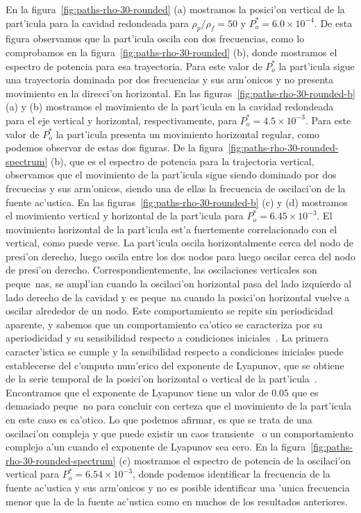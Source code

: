 En la figura~\ref{fig:paths-rho-30-rounded} (a) mostramos la posici'on vertical de la part'icula
para la cavidad redondeada para  $\rho_p/\rho_f = 50$ y  $P_o^\ast = 6.0\times 10^{-4} $. De
esta figura observamos que la part'icula oscila con dos frecuencias, como lo
comprobamos en la figura~\ref{fig:paths-rho-30-rounded} (b), donde mostramos el espectro
de potencia para esa trayectoria. Para este valor de $P_o^\ast$ la part'icula sigue una 
trayectoria dominada por dos frecuencias y sus arm'onicos y no presenta movimiento en la
direcci'on horizontal. En las figuras~\ref{fig:paths-rho-30-rounded-b} (a) y (b) mostramos
el movimiento de la part'icula en la cavidad redondeada para el eje vertical y 
horizontal, respectivamente, para $P_o^\ast = 4.5 \times 10^{-3}$. Para este valor 
de $P_o^\ast$ la part'icula presenta un movimiento horizontal regular, como podemos observar
de estas dos figuras. De la figura~\ref{fig:paths-rho-30-rounded-spectrum} (b), que es el
espectro de potencia para la trajectoria vertical, observamos que el movimiento de la part'icula
sigue siendo dominado por dos frecuecias y sus arm'onicos, siendo una de ellas la frecuencia
de oscilaci'on de la fuente ac'ustica.
En las figuras~\ref{fig:paths-rho-30-rounded-b} (c) y (d) mostramos
el movimiento vertical y horizontal de la part'icula para $P_o^\ast = 6.45\times 10^{-3}$. 
El movimiento horizontal de la part'icula est'a fuertemente correlacionado con el vertical, como 
puede verse. La part'icula oscila horizontalmente cerca del
nodo de presi'on derecho, luego oscila entre los dos nodos para luego oscilar cerca del nodo de 
presi'on derecho. Correspondientemente, las oscilaciones verticales son peque~nas, se ampl'ian
cuando la oscilaci'on horizontal pasa del lado izquierdo al lado derecho de la cavidad y es peque~na
cuando la posici'on horizontal vuelve a oscilar alrededor de un nodo. Este comportamiento se repite
sin periodicidad aparente, y sabemos que un comportamiento ca'otico se caracteriza por su
aperiodicidad y su sensibilidad respecto a condiciones iniciales~\cite{strogatzbook}. La primera
caracter'istica se cumple y la sensibilidad respecto a condiciones iniciales puede establecerse
del c'omputo num'erico del exponente de Lyapunov, que se obtiene de la serie temporal de la
posici'on horizontal o vertical de la part'icula~\cite{kantzbook}. Encontramos que el exponente de Lyapunov
tiene un valor de $0.05$ que es demasiado peque~no para concluir con certeza que el movimiento de la part'icula
en este caso es ca'otico. Lo que podemos afirmar, es que se trata de una oscilaci'on compleja y que
puede existir un caos transiente~\cite{strogatzbook} o un comportamiento complejo a'un cuando el exponente
de Lyapunov sea cero.
En la   figura~\ref{fig:paths-rho-30-rounded-spectrum} (c) mostramos el espectro de potencia
de la oscilaci'on vertical para $P^\ast_o=6.54\times 10^{-3}$, donde podemos identificar
la frecuencia de la fuente ac'ustica y sus arm'onicos y no es posible identificar una 'unica frecuencia
menor que la de la fuente ac'ustica como en muchos de los resultados anteriores.


